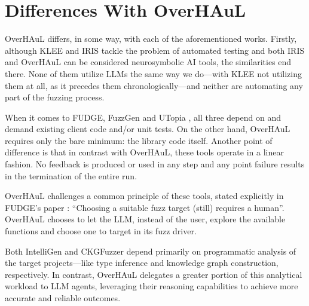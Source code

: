 \documentclass[
  a4paper,
]{scrreprt}
\theoremstyle{definition}
\theoremstyle{remark}
\begin{document}
\section{Differences With OverHAuL}\label{sec-differences}

OverHAuL differs, in some way, with each of the aforementioned works.
Firstly, although KLEE and IRIS \autocite{iris,klee} tackle the problem
of automated testing and both IRIS and OverHAuL can be considered
neurosymbolic AI tools, the similarities end there. None of them utilize
LLMs the same way we do---with KLEE not utilizing them at all, as it
precedes them chronologically---and neither are automating any part of
the fuzzing process.

When it comes to FUDGE, FuzzGen and UTopia
\autocite{utopia,fuzzgen,fudge}, all three depend on and demand existing
client code and/or unit tests. On the other hand, OverHAuL requires only
the bare minimum: the library code itself. Another point of difference
is that in contrast with OverHAuL, these tools operate in a linear
fashion. No feedback is produced or used in any step and any point
failure results in the termination of the entire run.

OverHAuL challenges a common principle of these tools, stated explicitly
in FUDGE's paper \autocite{fudge}: ``Choosing a suitable fuzz target
(still) requires a human''. OverHAuL chooses to let the LLM, instead of
the user, explore the available functions and choose one to target in
its fuzz driver.

Both IntelliGen and CKGFuzzer \autocite{zhang2021,xu2024} depend
primarily on programmatic analysis of the target projects---like type
inference and knowledge graph construction, respectively. In contrast,
OverHAuL delegates a greater portion of this analytical workload to LLM
agents, leveraging their reasoning capabilities to achieve more accurate
and reliable outcomes.
\end{document}

